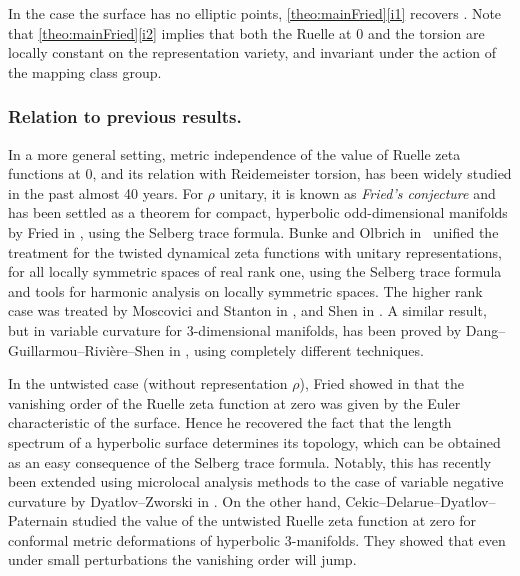\documentclass[JEP,XML,SOM,Unicode,NoFloatCountersInSection,published]{cedram}
\theoremstyle{plain}
\theoremstyle{definition}
\theoremstyle{remark}
\numberwithin{equation}{section}
\begin{document}
In the case the surface has no elliptic points, \cref{theo:mainFried}\eqref{i1} recovers \cite[Cor.\,C]{FS}. Note that \cref{theo:mainFried}\eqref{i2} implies that both the Ruelle at $0$ and the torsion are
locally constant on the representation variety, and invariant under the action of the mapping class group.

\subsubsection*{Relation to previous results.}
In a more general setting, metric independence of the value of Ruelle zeta functions at $0$, and its relation with Reidemeister torsion, has been widely studied in the past almost 40 years. For $\rho$ unitary, it is known as \textit{Fried's conjecture} and has been settled as a theorem for compact, hyperbolic odd-dimensional manifolds by Fried in \cite{Fried86}, using the Selberg trace formula. Bunke and Olbrich in~\cite{BO} unified the treatment for the twisted dynamical zeta functions with unitary representations, for all locally symmetric spaces of real rank one, using the Selberg trace formula and tools for harmonic analysis on locally symmetric spaces. The higher rank case was treated by Moscovici and Stanton in \cite{Moscovici_Stanton}, and Shen in \cite{Shen18}. A similar result, but in variable curvature for $3$-dimensional manifolds, has been proved by Dang--Guillarmou--Rivière--Shen in \cite{dang2019fried}, using completely different techniques.

In the untwisted case (without representation $\rho$), Fried showed in \cite{fried1986fuchsian} that the vanishing order of the Ruelle zeta function at zero was given by the Euler characteristic of the surface. Hence he recovered the fact that the length spectrum of a hyperbolic surface determines its topology, which can be obtained as an easy consequence of the Selberg trace formula. Notably, this has recently been extended using microlocal analysis methods to the case of variable negative curvature by Dyatlov--Zworski in \cite{dyatlov2017ruelle}. On the other hand, Cekic--Delarue--Dyatlov--Paternain \cite{CDDP22} studied the value of the untwisted Ruelle zeta function at zero for conformal metric deformations of hyperbolic 3\nobreakdash-manifolds. They showed that even under small perturbations the vanishing order will jump.
\end{document}
